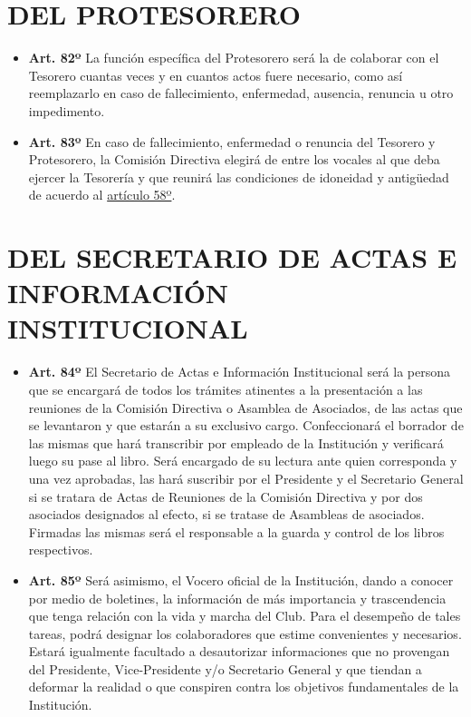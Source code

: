 \documentclass[openany]{book}
\providecommand{\tightlist}{%
  \setlength{\itemsep}{0pt}\setlength{\parskip}{0pt}}
\begin{document}
\hypertarget{cap14}{%
\chapter{DEL PROTESORERO}\label{cap14}}

\begin{itemize}
\tightlist
\item
  \textbf{Art. 82º}
  La función específica del Protesorero será la de colaborar con el Tesorero cuantas veces y en cuantos actos fuere necesario, como así reemplazarlo en caso de fallecimiento, enfermedad, ausencia, renuncia u otro impedimento.
\end{itemize}

\begin{itemize}
\tightlist
\item
  \textbf{Art. 83º}
  En caso de fallecimiento, enfermedad o renuncia del Tesorero y Protesorero, la Comisión Directiva elegirá de entre los vocales al que deba ejercer la Tesorería y que reunirá las condiciones de idoneidad y antigüedad de acuerdo al \protect\hyperlink{art58}{artículo 58º}.
\end{itemize}

\hypertarget{cap15}{%
\chapter{DEL SECRETARIO DE ACTAS E INFORMACIÓN INSTITUCIONAL}\label{cap15}}

\begin{itemize}
\tightlist
\item
  \textbf{Art. 84º}
  El Secretario de Actas e Información Institucional será la persona que se encargará de todos los trámites atinentes a la presentación a las reuniones de la Comisión Directiva o Asamblea de Asociados, de las actas que se levantaron y que estarán a su exclusivo cargo. Confeccionará el borrador de las mismas que hará transcribir por empleado de la Institución y verificará luego su pase al libro. Será encargado de su lectura ante quien corresponda y una vez aprobadas, las hará suscribir por el Presidente y el Secretario General si se tratara de Actas de Reuniones de la Comisión Directiva y por dos asociados designados al efecto, si se tratase de Asambleas de asociados. Firmadas las mismas será el responsable a la guarda y control de los libros respectivos.
\end{itemize}

\begin{itemize}
\tightlist
\item
  \textbf{Art. 85º}
  Será asimismo, el Vocero oficial de la Institución, dando a conocer por medio de boletines, la información de más importancia y trascendencia que tenga relación con la vida y marcha del Club. Para el desempeño de tales tareas, podrá designar los colaboradores que estime convenientes y necesarios. Estará igualmente facultado a desautorizar informaciones que no provengan del Presidente, Vice-Presidente y/o Secretario General y que tiendan a deformar la realidad o que conspiren contra los objetivos fundamentales de la Institución.
\end{itemize}
\end{document}
